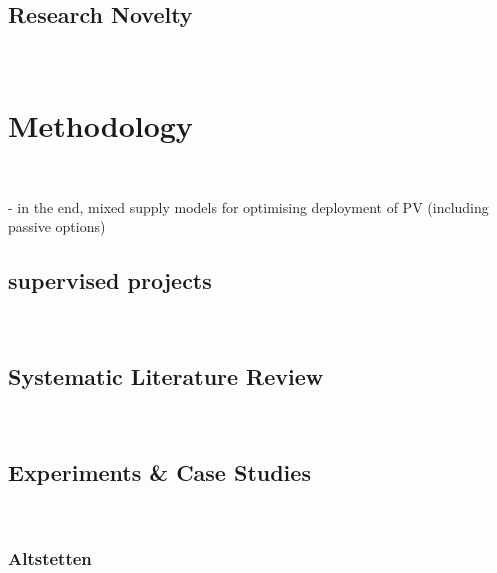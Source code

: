 \subsection{Research Novelty}\

\vspace{2cm}

\section{Methodology}\


- in the end, mixed supply models for optimising deployment of PV (including passive options)

\subsection{supervised projects}\

\vspace{2cm}


\subsection{Systematic Literature Review}\

\vspace{2cm}

\subsection{Experiments \& Case Studies}\
\vspace{1cm}
\subsubsection{Altstetten}

\vspace{1cm}

